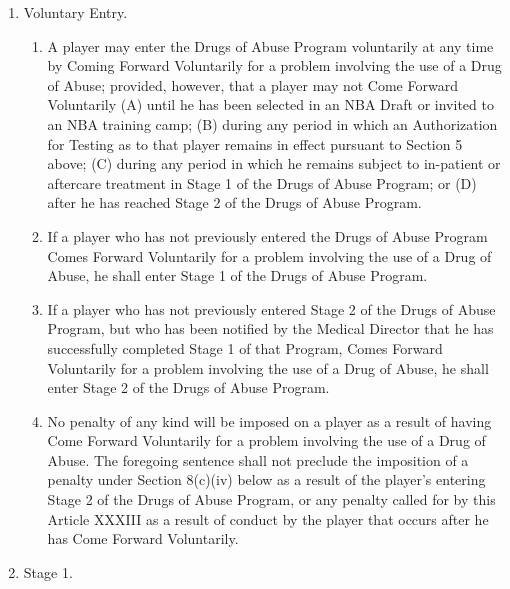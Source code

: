 \documentclass[
]{book}
\providecommand{\tightlist}{%
  \setlength{\itemsep}{0pt}\setlength{\parskip}{0pt}}
\begin{document}
\begin{enumerate}
\def\labelenumi{(\alph{enumi})}
\item
  Voluntary Entry.

  \begin{enumerate}
  \def\labelenumii{(\roman{enumii})}
  \tightlist
  \item
    A player may enter the Drugs of Abuse Program voluntarily at any time by Coming Forward Voluntarily for a problem involving the use of a Drug of Abuse; provided, however, that a player may not Come Forward Voluntarily (A) until he has been selected in an NBA Draft or invited to an NBA training camp; (B) during any period in which an Authorization for Testing as to that player remains in effect pursuant to Section 5 above; (C) during any period in which he remains subject to in-patient or aftercare treatment in Stage 1 of the Drugs of Abuse Program; or (D) after he has reached Stage 2 of the Drugs of Abuse Program.
  \item
    If a player who has not previously entered the Drugs of Abuse Program Comes Forward Voluntarily for a problem involving the use of a Drug of Abuse, he shall enter Stage 1 of the Drugs of Abuse Program.
  \item
    If a player who has not previously entered Stage 2 of the Drugs of Abuse Program, but who has been notified by the Medical Director that he has successfully completed Stage 1 of that Program, Comes Forward Voluntarily for a problem involving the use of a Drug of Abuse, he shall enter Stage 2 of the Drugs of Abuse Program.
  \item
    No penalty of any kind will be imposed on a player as a result of having Come Forward Voluntarily for a problem involving the use of a Drug of Abuse. The foregoing sentence shall not preclude the imposition of a penalty under Section 8(c)(iv) below as a result of the player's entering Stage 2 of the Drugs of Abuse Program, or any penalty called for by this Article XXXIII as a result of conduct by the player that occurs after he has Come Forward Voluntarily.
  \end{enumerate}
\item
  Stage 1.


\end{enumerate}
\end{document}
